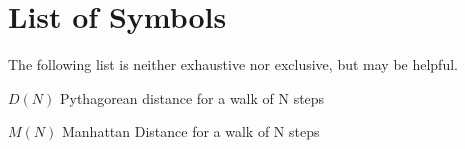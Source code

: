 \chapter{List of Symbols}


The following list is neither exhaustive nor exclusive, but may be helpful.
\begin{list}{}{%
\setlength{\labelwidth}{24mm}
\setlength{\leftmargin}{35mm}}
\item[$D(N)$] Pythagorean distance for a walk of N steps
\item[$M(N)$] Manhattan Distance for a walk of N steps
\end{list}
